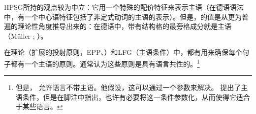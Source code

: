 HPSG\indexhpsg 所持的观点较为中立：它用一个特殊的配价特征来表示主语（在德语语法中，有一个中心语特征包括了非定式动词的主语的表示）。但是，\subjf 的值是从更为普遍的理论性角度推导出来的：在德语中，带有结构格的最旁格成分就是主语（Müller \citeyear[]{Mueller2002b}; \citeyear[]{MuellerLehrbuch1}）。

在\gb 理论（扩展的投射原则，EPP、）和LFG\indexlfg （主语条件）中，都有用来确保每个句子都有一个主语的原则。通常认为这些原则是具有语言共性的。\footnote{ 
但是， \citet[]{Chomsky81a} 允许语言不带主语。他假设，这可以通过一个参数来解决。\citet[]{Bresnan2001a} 提出了主语条件，但是在脚注中指出，也许有必要将这一条件参数化，从而使得它适合于某些语言。%
} 
 
